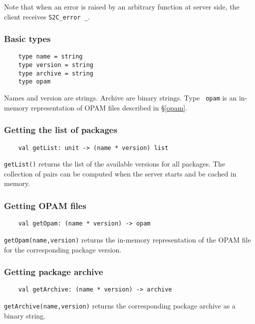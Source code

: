 \documentclass[a4paper,11pt]{article}
\begin{document}
Note that when an error is raised by an arbitrary function
 at server side, the client receives \verb|S2C_error _|.

\subsubsection{Basic types}

\begin{verbatim}
    type name = string
    type version = string
    type archive = string
    type opam
\end{verbatim}

Names and version are strings. Archive are binary strings. Type {\tt
  opam} is an in-memory representation of OPAM files described in
\S\ref{opam}.


\subsubsection{Getting the list of packages}
\label{getList}

\begin{verbatim}
    val getList: unit -> (name * version) list
\end{verbatim}

{\tt getList()} returns the list of the available versions for all
packages. The collection of pairs can be computed when the server
starts and be cached in memory.

\subsubsection{Getting OPAM files}
\label{getOpam}

\begin{verbatim}
    val getOpam: (name * version) -> opam
\end{verbatim}

{\tt getOpam(name,version)} returns the in-memory representation of
the OPAM file for the corresponding package version.

\subsubsection{Getting package archive}
\label{getArchive}

\begin{verbatim}
    val getArchive: (name * version) -> archive
\end{verbatim}

{\tt getArchive(name,version)} returns the corresponding package
archive as a binary string.
\end{document}
